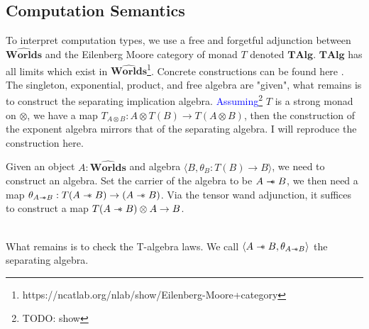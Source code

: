 \documentclass{article}
\newcommand{\blue}[1]{\textcolor{blue}{#1}}
\newcommand\sep{\mathrel{-\mkern-6mu*}}
\newcommand{\worlds}{\widehat{\mathbf{Worlds}}}
\begin{document}
\subsection{Computation Semantics}
To interpret computation types, we use a free and forgetful adjunction between $\worlds$ and the Eilenberg Moore category of monad $T$ denoted $\mathbf{TAlg}$. $\mathbf{TAlg}$ has all limits which exist in $\worlds$\footnote{https://ncatlab.org/nlab/show/Eilenberg-Moore+category}. Concrete constructions can be found here \cite{forster_call-by-push-value_2019}. The singleton, exponential, product, and free algebra are "given", what remains is to construct the separating implication algebra. 
\blue{Assuming}\footnote{TODO: show} $T$ is a strong monad on $\otimes$, we have a map $T_{A \otimes B} : A \otimes T(B) \rightarrow T(A \otimes B)$, then the construction of the exponent algebra mirrors that of the separating algebra. I will reproduce the construction here.

Given an object $A : \worlds$ and algebra $\langle B , \theta_B : T(B) \rightarrow B\rangle$, we need to construct an algebra. Set the carrier of the algebra to be $A \sep B$, we then need a map $\theta_{A\sep B} : T(A \sep B) \rightarrow (A \sep B)$. Via the tensor wand adjunction, it suffices to construct a map $T(A \sep B)\otimes A \rightarrow B$.
\begin{figure}[!h]
\centering
{}
\end{figure}
\\
What remains is to check the T-algebra laws. We call $\langle A \sep B , \theta_{A \sep B}\rangle$ the separating algebra.

\newpage
\end{document}
